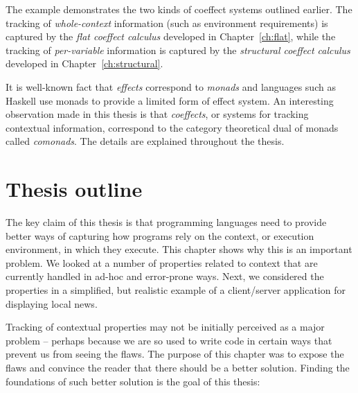 The example demonstrates the two kinds of coeffect systems outlined earlier. The tracking of
\emph{whole-context} information (such as environment requirements) is captured by the \emph{flat
coeffect calculus} developed in Chapter~\ref{ch:flat}, while the tracking of \emph{per-variable}
information is captured by the \emph{structural coeffect calculus} developed in Chapter~\ref{ch:structural}.

It is well-known fact that \emph{effects} correspond to \emph{monads} and languages such as Haskell 
use monads to provide a limited form of effect system. An interesting observation made in this thesis 
is that \emph{coeffects}, or systems for tracking contextual information, correspond to the category 
theoretical dual of monads called \emph{comonads}. The details are explained throughout the thesis.

%
%
                                                 
\section{Thesis outline}

The key claim of this thesis is that programming languages need to provide better ways of capturing
how programs rely on the context, or execution environment, in which they execute. This chapter 
shows why this is an important problem. We looked at a number of properties related to context that 
are currently handled in ad-hoc and error-prone ways. Next, we considered the properties in a 
simplified, but realistic example of a client/server application for displaying local news.

Tracking of contextual properties may not be initially perceived as a major problem -- perhaps
because we are so used to write code in certain ways that prevent us from seeing the flaws. The
purpose of this chapter was to expose the flaws and convince the reader that there should be a
better solution. Finding the foundations of such better solution is the goal of this thesis:

